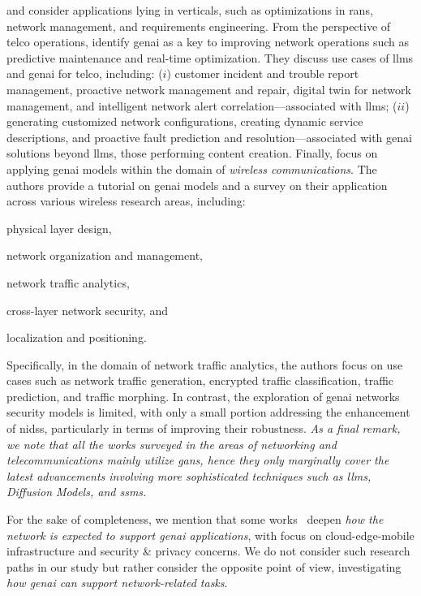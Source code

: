and consider applications lying in verticals, 
such as optimizations in \glspl{ran}, network management, and requirements engineering.
From the perspective of 
telco operations, 
\citet{chaccour2024telecom} 
identify \gls{genai} as a key to improving network operations such as predictive maintenance and real-time optimization.
They discuss use cases of \glspl{llm} and \gls{genai} for telco,
including: 
($i$) customer incident and trouble report management, proactive network management and repair, digital twin for network management, and intelligent network alert correlation---associated with \glspl{llm}; 
($ii$) generating customized network configurations, creating dynamic service descriptions, and proactive fault prediction and resolution---associated with \gls{genai} solutions beyond \glspl{llm}, \ie those performing content creation.
Finally, \citet{celik2024dawn} focus on applying \gls{genai} models within the domain of \emph{wireless communications}. The authors provide a tutorial on \gls{genai} models and a survey on their application across various wireless research areas, including: 
\begin{enumerate*}[label=(\emph{\roman*})]
    \item physical layer design,
    \item network organization and management,
    \item network traffic analytics,
    \item cross-layer network security, and
    \item localization and positioning.
\end{enumerate*}
Specifically, in the domain of network traffic analytics, the authors focus on use cases such as network traffic generation, encrypted traffic classification, traffic prediction, and traffic morphing. 
In contrast, the exploration of \gls{genai} networks security models is limited, with only a small portion addressing the enhancement of \glspl{nids}, particularly in terms of improving their robustness.
\emph{As a final remark, we note that all the works surveyed in the areas of
networking and telecommunications
mainly utilize \glspl{gan}, hence they only marginally cover the latest advancements involving more sophisticated techniques such as \glspl{llm}, Diffusion Models, and \glspl{ssm}.}

For the sake of completeness, we mention that some works~\cite{xu2024unleashing, wang2024toward} deepen \emph{how the network is expected to support \gls{genai} applications}, \eg with focus on cloud-edge-mobile infrastructure and security \& privacy concerns.
We do not consider such research paths in our study but rather consider the opposite point of view, investigating \emph{how \gls{genai} can support network-related tasks}.

